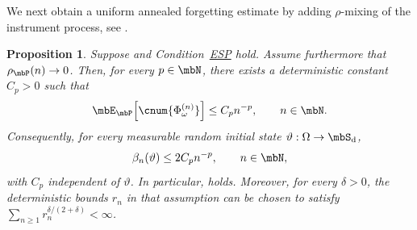 \documentclass[a4paper]{article}
\numberwithin{equation}{section}   %
\theoremstyle{plain}   %
\theoremstyle{plain}   %
\newtheorem{prop}[lemma]{Proposition}   %
\theoremstyle{examplestyle}
\DeclareMathOperator{\states}{\mbS_d}   %
\DeclareMathOperator{\pr}{\mbP}           %
\newcommand{\esp}{{\hyperlink{esp}{ESP}}}
\begin{document}
    We next obtain a uniform annealed forgetting estimate by adding \(\rho\)-mixing of the instrument process, see . 

    \begin{prop}
    \label{prop:rho_esp_forgetting}
        Suppose  and Condition~{\esp}  hold.
        Assume furthermore that \(\rho_{\pr}(n)\to0\). 
        Then, for every \(p\in\mbN\), there exists a deterministic constant \(C_p>0\) such that
        \[
            \mbE_{\pr}\!\left[\cnum{\Phi_\omega^{(n)}}\right]
            \le C_p n^{-p},
            \qquad n\in\mbN.
        \]
        Consequently, for every measurable random initial state \(\vartheta:\Omega\to\states\),
        \[
            \beta_n(\vartheta)\le2C_p n^{-p},
            \qquad n\in\mbN,
        \]
        with \(C_p\) independent of \(\vartheta\). 
        In particular,  holds. 
        Moreover, for every \(\delta>0\), the deterministic bounds \(r_n\) in that assumption can be chosen to satisfy \(\sum_{n\ge1}r_n^{\delta/(2+\delta)}<\infty\).
    \end{prop}
\end{document}
